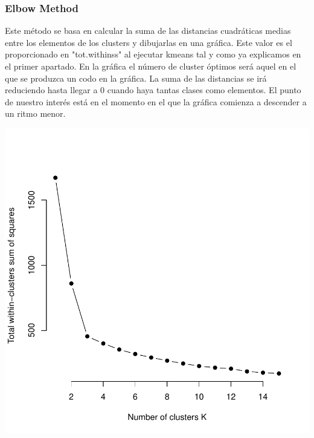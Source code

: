 \documentclass [a4paper] {article}
\begin{document}
\subsubsection{Elbow Method}
Este método se basa en calcular la suma de las distancias cuadráticas medias entre los elementos de los clusters y dibujarlas en una gráfica.
Este valor es el proporcionado en "tot.withinss" al ejecutar kmeans tal y como ya explicamos en el primer apartado.
En la gráfica el número de cluster óptimos será aquel en el que se produzca un codo en la gráfica.
La suma de las distancias se irá reduciendo hasta llegar a 0 cuando haya tantas clases como elementos.
El punto de nuestro interés está en el momento en el que la gráfica comienza a descender a un ritmo menor.
\begin{center}
\begin{Schunk}
\end{Schunk}
\includegraphics{entrega-optimal_number_of_clusters_1}
\end{center}
\end{document}
